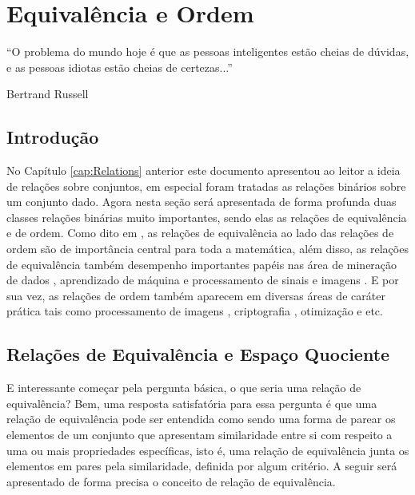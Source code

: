 \chapter{Equivalência e Ordem}\label{cap:EqOrder}

\epigraph{``O problema do mundo hoje é que as pessoas inteligentes estão cheias de dúvidas, e as pessoas idiotas estão cheias de certezas...''}{Bertrand Russell}

\section{Introdução}\label{sec:IntroEqOrder}

No Capítulo \ref{cap:Relations} anterior este documento apresentou ao leitor a ideia de relações sobre conjuntos, em especial foram tratadas as relações binários sobre um conjunto dado. Agora nesta seção será apresentada de forma profunda duas classes relações binárias muito importantes, sendo elas as relações de equivalência e de ordem. Como dito em \cite{abe1991-TC, carmo2013}, as relações de equivalência ao lado das relações de ordem são de importância central para toda a matemática, além disso, as relações de equivalência também desempenho importantes papéis nas área de mineração de dados \cite{lin1999data, lingras1998data}, aprendizado de máquina \cite{bar2003learning} e processamento de sinais \cite{li2007equivalent} e imagens \cite{acharya2003classification, myasnikov2018description}. E por sua vez, as relações de ordem também aparecem em diversas áreas de caráter prática tais como processamento de imagens \cite{farias2016image, cressie1998image}, criptografia \cite{giri2008crypto}, otimização \cite{karaman2018partial} e etc.

\section{Relações de Equivalência e Espaço Quociente}\label{sec:Equivalence}

E interessante começar pela pergunta básica, o que seria uma relação de equivalência? Bem, uma resposta satisfatória para essa pergunta é que uma relação de equivalência pode ser entendida como sendo uma forma de parear os elementos de um conjunto que apresentam similaridade entre si com respeito a uma ou mais propriedades específicas, isto é, uma relação de equivalência junta os elementos em pares pela similaridade, definida por algum critério. A seguir será apresentado de forma precisa o conceito de relação de equivalência.

